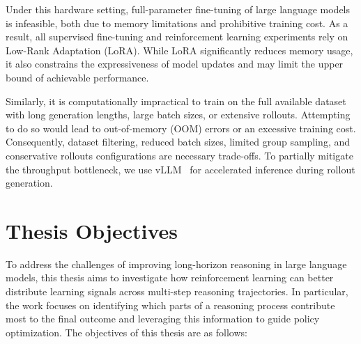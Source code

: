 \documentclass[12pt]{report}
\begin{document}
Under this hardware setting, full-parameter fine-tuning of large language models is infeasible, both due to memory limitations and prohibitive training cost. As a result, all supervised fine-tuning and reinforcement learning experiments rely on Low-Rank Adaptation (LoRA)\cite{hu2021loralowrankadaptationlarge}. While LoRA significantly reduces memory usage, it also constrains the expressiveness of model updates and may limit the upper bound of achievable performance.

Similarly, it is computationally impractical to train on the full available dataset with long generation lengths, large batch sizes, or extensive rollouts. Attempting to do so would lead to out-of-memory (OOM) errors or an excessive training cost. Consequently, dataset filtering, reduced batch sizes, limited group sampling, and conservative rollouts configurations are necessary trade-offs.  To partially mitigate the throughput bottleneck, we use vLLM~\cite{kwon2023efficientmemorymanagementlarge} for accelerated inference during rollout generation.


\section{Thesis Objectives}

To address the challenges of improving long-horizon reasoning in large language models, this thesis aims to investigate how reinforcement learning can better distribute learning signals across multi-step reasoning trajectories. 
In particular, the work focuses on identifying which parts of a reasoning process contribute most to the final outcome and leveraging this information to guide policy optimization. The objectives of this thesis are as follows:
\end{document}
